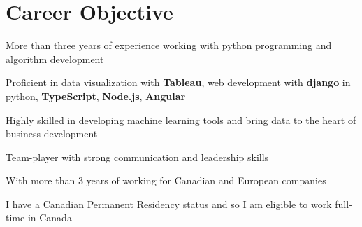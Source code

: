 \documentclass[letter,11pt]{article}
\begin{document}

\section{Career Objective}
\begin{zitemize}
	\item More than three years of experience working with python programming and algorithm development
	\item Proficient in data visualization with \textbf{Tableau}, web development with \textbf{django} in python, \textbf{TypeScript}, \textbf{Node.js}, \textbf{Angular}
	\item Highly skilled in developing machine learning tools and bring data to the heart of business development
	\item Team-player with strong communication and leadership skills
	\item With more than 3 years of working for Canadian and European companies
	\item I have a Canadian Permanent Residency status and so I am eligible to work full-time in Canada
\end{zitemize}
\end{document}
